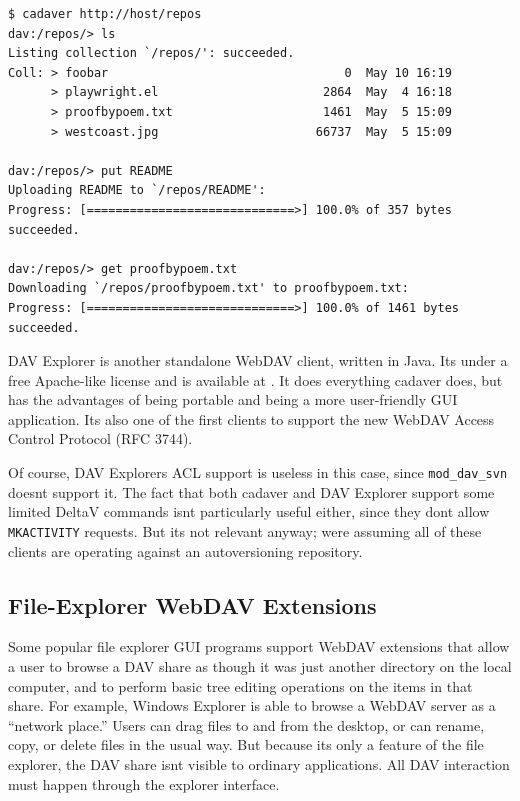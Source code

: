 \begin{verbatim}
$ cadaver http://host/repos
dav:/repos/> ls
Listing collection `/repos/': succeeded.
Coll: > foobar                                 0  May 10 16:19
      > playwright.el                       2864  May  4 16:18
      > proofbypoem.txt                     1461  May  5 15:09
      > westcoast.jpg                      66737  May  5 15:09

dav:/repos/> put README
Uploading README to `/repos/README':
Progress: [=============================>] 100.0% of 357 bytes succeeded.

dav:/repos/> get proofbypoem.txt
Downloading `/repos/proofbypoem.txt' to proofbypoem.txt:
Progress: [=============================>] 100.0% of 1461 bytes succeeded.
\end{verbatim}

DAV Explorer is another standalone WebDAV client, written in Java.
It\textquotesingle s under a free Apache-like license and is available
at \href{https://www.davexplorer.org/}{}. It does everything cadaver
does, but has the advantages of being portable and being a more
user-friendly GUI application. It\textquotesingle s also one of the
first clients to support the new WebDAV Access Control Protocol (RFC
3744).

Of course, DAV Explorer\textquotesingle s ACL support is useless in this
case, since \texttt{mod\_dav\_svn} doesn\textquotesingle t support it.
The fact that both cadaver and DAV Explorer support some limited DeltaV
commands isn\textquotesingle t particularly useful either, since they
don\textquotesingle t allow \texttt{MKACTIVITY} requests. But
it\textquotesingle s not relevant anyway; we\textquotesingle re assuming
all of these clients are operating against an autoversioning repository.

\subsection{File-Explorer WebDAV
Extensions}\label{svn.webdav.clients.file-explorer-extensions}

Some popular file explorer GUI programs support WebDAV extensions that
allow a user to browse a DAV share as though it was just another
directory on the local computer, and to perform basic tree editing
operations on the items in that share. For example, Windows Explorer is
able to browse a WebDAV server as a ``network place.'' Users can drag
files to and from the desktop, or can rename, copy, or delete files in
the usual way. But because it\textquotesingle s only a feature of the
file explorer, the DAV share isn\textquotesingle t visible to ordinary
applications. All DAV interaction must happen through the explorer
interface.

